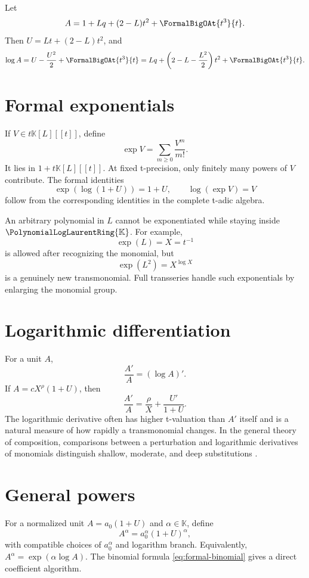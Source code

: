 \documentclass[11pt,openany]{book}
\theoremstyle{definition}
\theoremstyle{plain}
\theoremstyle{remark}
\newcommand{\K}{\mathbb{K}}
\begin{document}
\begin{workedbox}
Let
\[
 A=1+Lq+(2-L)t^2+\FormalBigOAt{t^3}{t}.
\]
Then \(U=Lt+(2-L)t^2\), and
\[
 \log A=U-\frac{U^2}{2}+\FormalBigOAt{t^3}{t}
 =Lq+\left(2-L-\frac{L^2}{2}\right)t^2+\FormalBigOAt{t^3}{t}.
\]
\end{workedbox}

\section{Formal exponentials}
If \(V\in t\K[L][[t]]\), define
\begin{equation}\label{eq:formal-exp-small}
 \exp V=\sum_{m\ge0}\frac{V^m}{m!}.
\end{equation}
It lies in \(1+t\K[L][[t]]\).  At fixed t-precision, only finitely many powers
of \(V\) contribute.  The formal identities
\[
 \exp(\log(1+U))=1+U,
 \qquad
 \log(\exp V)=V
\]
follow from the corresponding identities in the complete t-adic algebra.

An arbitrary polynomial in \(L\) cannot be exponentiated while staying inside
\(\PolynomialLogLaurentRing{\K}\).  For example,
\[
 \exp(L)=X=t^{-1}
\]
is allowed after recognizing the monomial, but
\[
 \exp(L^2)=X^{\log X}
\]
is a genuinely new transmonomial.  Full transseries handle such exponentials
by enlarging the monomial group.

\section{Logarithmic differentiation}
For a unit \(A\),
\begin{equation}\label{eq:logderivative}
 \frac{A'}A=(\log A)'.
\end{equation}
If \(A=cX^\rho(1+U)\), then
\[
 \frac{A'}A=\frac\rho X+\frac{U'}{1+U}.
\]
The logarithmic derivative often has higher t-valuation than \(A'\) itself and
is a natural measure of how rapidly a transmonomial changes.  In the general
theory of composition, comparisons between a perturbation and logarithmic
derivatives of monomials distinguish shallow, moderate, and deep substitutions
\cite{edgar-composition}.

\section{General powers}
For a normalized unit \(A=a_0(1+U)\) and \(\alpha\in\K\), define
\begin{equation}\label{eq:general-power}
 A^\alpha=a_0^\alpha(1+U)^\alpha,
\end{equation}
with compatible choices of \(a_0^\alpha\) and logarithm branch.  Equivalently,
\(A^\alpha=\exp(\alpha\log A)\).  The binomial formula
\cref{eq:formal-binomial} gives a direct coefficient algorithm.
\end{document}
